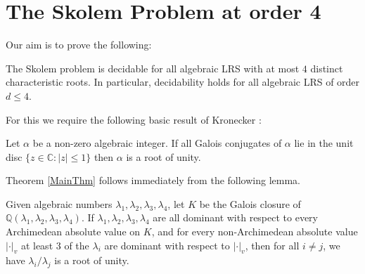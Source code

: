 \documentclass{theoretics}
\newcommand{\Q}{\mathbb{Q}}
\begin{document}
\section{The Skolem Problem at order 4}
Our aim is to prove the following:
\begin{theorem} \label{MainThm}
	The Skolem problem is decidable for all algebraic LRS with at most $4$ distinct characteristic roots. In particular, decidability holds for all algebraic LRS of order $d \leq 4$.
\end{theorem}
For this we require the following basic result of Kronecker \cite{Kronecker}:
\begin{theorem}[Kronecker] \label{Kronecker}
	Let $\alpha$ be a non-zero algebraic integer. If all Galois conjugates of $\alpha$ lie in the unit disc $\{z \in \mathbb C : |z| \leq 1\}$ then $\alpha$ is a root of unity.
\end{theorem}
Theorem \ref{MainThm} follows immediately from the following lemma.
\begin{lemma} \label{MainLemma}
Given algebraic numbers $\lambda_1, \lambda_2, \lambda_3, \lambda_4$, let $K$ be the Galois closure of $\Q(\lambda_1, \lambda_2, \lambda_3, \lambda_4)$. If $\lambda_1, \lambda_2, \lambda_3, \lambda_4$ are all dominant with respect to every Archimedean absolute value on $K$, and for every non-Archimedean absolute value $|\cdot|_v$ at least 3 of the $\lambda_i$ are dominant with respect to $|\cdot|_v$, then for all $i \neq j$, we have $\lambda_i/\lambda_j$ is a root of unity. 
\end{lemma}
\end{document}
